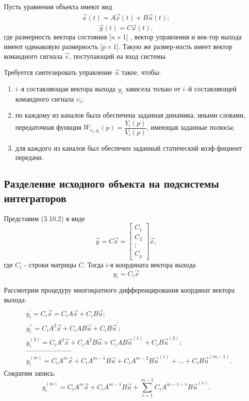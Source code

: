 Пусть уравнения объекта имеют вид
\begin{equation}
	\dot{\vec{x}}(t)=A\vec{x}(t)+B\vec{u}(t);
\end{equation}
\begin{equation}
	\dot{\vec{y}}(t)=C\vec{x}(t),
\end{equation}
где размерность вектора состояния [$n\times1$] , вектор управления и век-тор выхода имеют одинаковую размерность [$p\times1$]. Такую же размер-ность имеет вектор командного сигнала $\vec{v}$, поступающий на вход системы. 

Требуется синтезировать управление $\vec{u}$ такое, чтобы:
\begin{enumerate}
\renewcommand\labelenumi{\theenumi)}
\item $i$–я составляющая вектора выхода $y_i$ зависела только от $i$–й составляющей командного сигнала $v_i$;
\item по каждому из каналов была обеспечена заданная динамика, иными словами, передаточная функция $W_{v_i,y_i}(p)=\dfrac{Y_i(p)}{V_i(p)}$, имеющая заданные полюсы;
\item для каждого из каналов был обеспечен заданный статический коэф-фициент передачи.
\end{enumerate}

\subsection{Разделение исходного объекта на подсистемы интеграторов}
Представим (3.10.2) в виде
\begin{equation*}
	\vec{y}=C\vec{x}= 
	\begin{bmatrix}
	    C_1  \\
	    C_2  \\
	    \vdots \\
	    C_p
	\end{bmatrix}
	\vec{x},
\end{equation*}
где $C_i$ - строки матрицы $C$. Тогда $i$-я координата вектора выхода
\begin{equation*}
	y_i=C_i\vec{x}
\end{equation*}

Рассмотрим процедуру многократного дифференцирования координат вектора выхода:
\begin{gather}
\begin{split}
	&y_i^{\prime}=C_i\dot{\vec{x}}=C_iA\vec{x}+C_iB\vec{u};\\
	&y_i^{\prime\prime}=C_iA^2\vec{x}+C_iAB\vec{u}+C_iB\vec{u}^{\prime};\\
	&y_i^{(3)}=C_iA^3\vec{x}+C_iA^2B\vec{u}+C_iAB\vec{u}^{(1)}+C_iB\vec{u}^{(2)};\\
	&\dots\dots\dots\dots\dots\dots\dots\dots\\
	&y_i^{(m)}=C_iA^m\vec{x}+C_iA^{m-1}B\vec{u}+C_iA^{m-2}B\vec{u}^{(1)}+\dots+C_iB\vec{u}^{(m-1)}.
\end{split}
\end{gather}
Сократим запись:
\begin{equation}
	y_i^{(m)}=C_iA^m\vec{x}+C_iA^{m-1}B\vec{u}+\sum_{v=1}^{m-1}C_iA^{m-1-v}B\vec{u}^{(v)}.
\end{equation}

